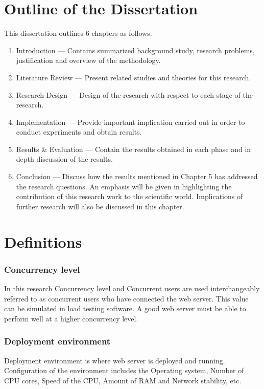 \section{Outline of the Dissertation}

This dissertation outlines 6 chapters as follows.

\begin{enumerate}
	\item Introduction — Contains summarized background study, research problems, justification and overview of the methodology.
	\item Literature Review — Present related studies and theories for this research.
	\item Research Design — Design of the research with respect to each stage of the research.
	\item Implementation — Provide important implication carried out in order to conduct experiments and obtain results. 
	\item Results \& Evaluation — Contain the results obtained in each phase and in depth discussion of the results.
	\item Conclusion — Discuss how the results mentioned in Chapter 5 has addressed the research questions. An emphasis will be given in highlighting the contribution of this research work to the scientific world. Implications of further research will also be discussed in this chapter.
\end{enumerate}

\section{Definitions}

\subsubsection{Concurrency level}

In this research Concurrency level and Concurrent users are used interchangeably referred to as concurrent users who have connected the web server. This value can be simulated in load testing software. A good web server must be able to perform well at a higher concurrency level.

\subsubsection{Deployment environment}

Deployment environment is where web server is deployed and running. Configuration of the environment includes the Operating system, Number of CPU cores, Speed of the CPU, Amount of RAM and Network stability, etc.

